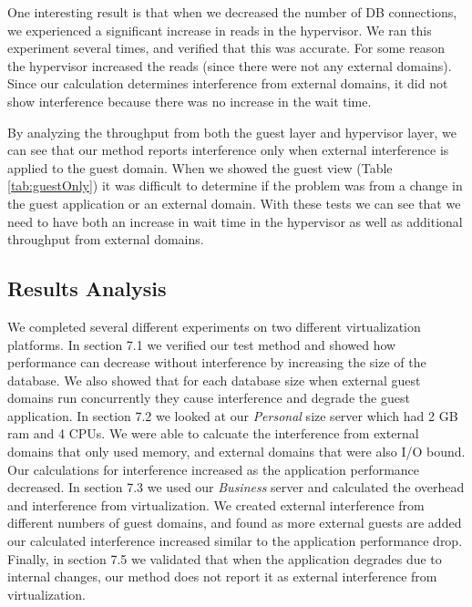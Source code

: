 One interesting result is that when we decreased the number of DB connections, we experienced a significant increase in reads in the hypervisor.  We ran this experiment several times, and verified that this was accurate.  For some reason the hypervisor increased the reads (since there were not any external domains).  Since our calculation determines interference from external domains, it did not show interference because there was no increase in the wait time.

By analyzing the throughput from both the guest layer and hypervisor layer, we can see that our method reports interference only when external interference is applied to the guest domain.  When we showed the guest view (Table \ref{tab:guestOnly}) it was difficult to determine if the problem was from a change in the guest application or an external domain.  With these tests we can see that we need to have both an increase in wait time in the hypervisor as well as additional throughput from external domains.


\subsection{Results Analysis}
We completed several different experiments on two different virtualization platforms.  In section 7.1 we verified our test method and showed how performance can decrease without interference by increasing the size of the database.  We also showed that for each database size when external guest domains run concurrently they cause interference and degrade the guest application.  In section 7.2 we looked at our \emph{Personal} size server which had 2 GB ram and 4 CPUs.  We were able to calcuate the interference from external domains that only used memory, and external domains that were also I/O bound.  Our calculations for interference increased as the application performance decreased.  In section 7.3 we used our \emph{Business} server and calculated the overhead and interference from virtualization.  We created external interference from different numbers of guest domains, and found as more external guests are added our calculated interference increased similar to the application performance drop.  Finally, in section 7.5 we validated that when the application degrades due to internal changes, our method does not report it as external interference from virtualization.



